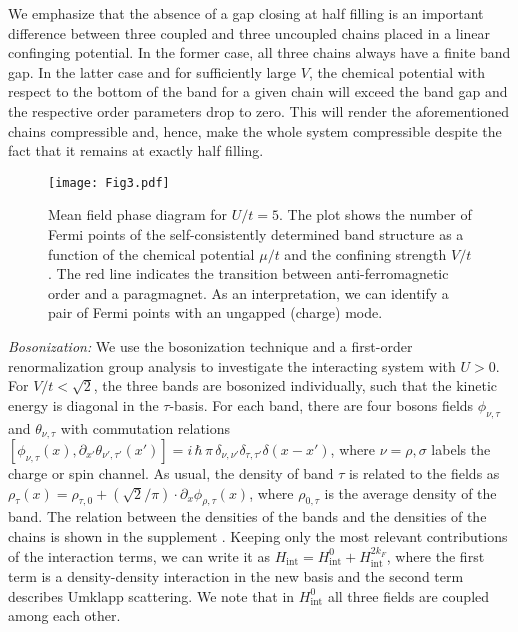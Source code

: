 \documentclass[twocolumn, prl, aps, floatfix, superscriptaddress, longbibliography]{revtex4-1}
\begin{document}
We emphasize that the absence of a gap closing at half filling is an important difference between three coupled and three uncoupled chains placed in a linear confinging potential. In the former case, all three chains always have a finite band gap. In the latter case and for sufficiently large $V$, the chemical potential with respect to the bottom of the band for a given chain will exceed the band gap and the respective order parameters drop to zero. This will render the aforementioned chains compressible and, hence, make the whole system compressible despite the fact that it remains at exactly half filling.
%
\begin{figure}[t!]
	\centering
	\texttt{[image: Fig3.pdf]}
	\caption{Mean field phase diagram for $U/t=5$. The plot shows the number of Fermi points of the self-consistently determined band structure as a function of the chemical potential $\mu/t$ and the confining strength $V/t$. The red line indicates the transition between anti-ferromagnetic order and a paragmagnet. As an interpretation, we can identify a pair of Fermi points with an ungapped (charge) mode.}
	\label{fig:Fig3}
\end{figure}
%

\noindent \textit{Bosonization:} We use the bosonization technique and a first-order renormalization group analysis to investigate the interacting system with $U>0$. For $V/t<\sqrt{2}$, the three bands are bosonized individually, such that the kinetic energy is diagonal in the $\tau$-basis. For each band, there are four bosons fields $\phi_{\nu,\tau}$ and $\theta_{\nu,\tau}$ with commutation relations  $[\phi_{\nu,\tau}(x),\partial_{x'}\theta_{\nu',\tau'}(x')] = i \,\hbar \, \pi\, \delta_{\nu,\nu'}\delta_{\tau,\tau'}\delta(x-x')$, where $\nu = \rho, \sigma$ labels the charge or spin channel. As usual, the density of band $\tau$ is related to the fields as $\rho_{\tau}(x) = \rho_{\tau,0} + (\sqrt{2}/\pi) \cdot \partial_x\phi_{\rho,\tau}(x)$, where $\rho_{0,\tau}$ is the average density of the band. The relation between the densities of the bands and the densities of the chains is shown in the supplement \cite{supp}.
Keeping only the most relevant contributions of the interaction terms, we can write it as $H_{\text{int}} = H_{\text{int}}^0 + H_{\text{int}}^{2k_F}$, where the first term is a density-density interaction in the new basis and the second term describes Umklapp scattering.  We note that in  $H_{\text{int}}^0$ all three fields are coupled among each other. 
\end{document}
